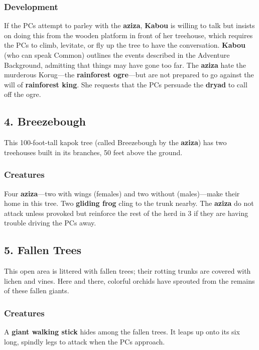 \documentclass[10pt,a4paper,twoside,bg=print,twocolumn,openany,nodeprecatedcode]{dndbook}
\begin{document}
\subsubsection{Development}
If the PCs attempt to parley with the \textbf{aziza}, \textbf{Kabou} is willing to talk but insists on doing this from the wooden platform in front of her treehouse, which requires the PCs to climb, levitate, or fly up the tree to have the conversation. \textbf{Kabou} (who can speak Common) outlines the events described in the Adventure Background, admitting that things may have gone too far. The \textbf{aziza} hate the murderous Korug—the \textbf{rainforest ogre}—but are not prepared to go against the will of \textbf{rainforest king}. She requests that the PCs persuade the \textbf{dryad} to call off the ogre.

\subsection{4. Breezebough}
This 100-foot-tall kapok tree (called Breezebough by the \textbf{aziza}) has two treehouses built in its branches, 50 feet above the ground.

\subsubsection{Creatures}
Four \textbf{aziza}—two with wings (females) and two without (males)—make their home in this tree. Two \textbf{gliding frog} cling to the trunk nearby. The \textbf{aziza} do not attack unless provoked but reinforce the rest of the herd in 3 if they are having trouble driving the PCs away.

\subsection{5. Fallen Trees}
\begin{DndReadAloud}{}
This open area is littered with fallen trees; their rotting trunks are covered with lichen and vines. Here and there, colorful orchids have sprouted from the remains of these fallen giants.

\end{DndReadAloud}

\subsubsection{Creatures}
A \textbf{giant walking stick} hides among the fallen trees. It leaps up onto its six long, spindly legs to attack when the PCs approach.
\end{document}
